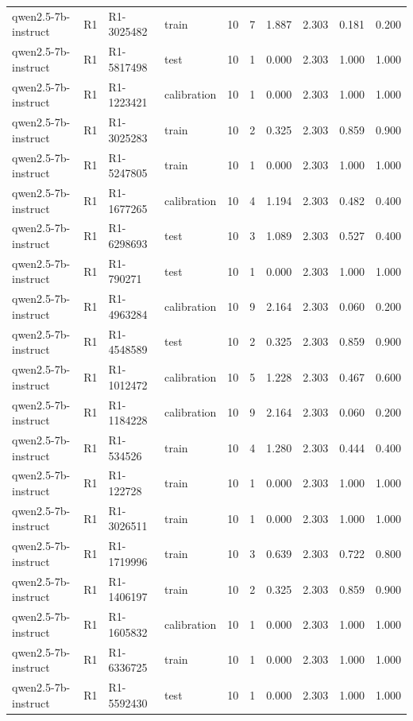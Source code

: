 \begin{table}
\begin{tabular}{llllrrrrrr}
qwen2.5-7b-instruct & R1 & R1-3025482 & train & 10 & 7 & 1.887 & 2.303 & 0.181 & 0.200 \\
qwen2.5-7b-instruct & R1 & R1-5817498 & test & 10 & 1 & 0.000 & 2.303 & 1.000 & 1.000 \\
qwen2.5-7b-instruct & R1 & R1-1223421 & calibration & 10 & 1 & 0.000 & 2.303 & 1.000 & 1.000 \\
qwen2.5-7b-instruct & R1 & R1-3025283 & train & 10 & 2 & 0.325 & 2.303 & 0.859 & 0.900 \\
qwen2.5-7b-instruct & R1 & R1-5247805 & train & 10 & 1 & 0.000 & 2.303 & 1.000 & 1.000 \\
qwen2.5-7b-instruct & R1 & R1-1677265 & calibration & 10 & 4 & 1.194 & 2.303 & 0.482 & 0.400 \\
qwen2.5-7b-instruct & R1 & R1-6298693 & test & 10 & 3 & 1.089 & 2.303 & 0.527 & 0.400 \\
qwen2.5-7b-instruct & R1 & R1-790271 & test & 10 & 1 & 0.000 & 2.303 & 1.000 & 1.000 \\
qwen2.5-7b-instruct & R1 & R1-4963284 & calibration & 10 & 9 & 2.164 & 2.303 & 0.060 & 0.200 \\
qwen2.5-7b-instruct & R1 & R1-4548589 & test & 10 & 2 & 0.325 & 2.303 & 0.859 & 0.900 \\
qwen2.5-7b-instruct & R1 & R1-1012472 & calibration & 10 & 5 & 1.228 & 2.303 & 0.467 & 0.600 \\
qwen2.5-7b-instruct & R1 & R1-1184228 & calibration & 10 & 9 & 2.164 & 2.303 & 0.060 & 0.200 \\
qwen2.5-7b-instruct & R1 & R1-534526 & train & 10 & 4 & 1.280 & 2.303 & 0.444 & 0.400 \\
qwen2.5-7b-instruct & R1 & R1-122728 & train & 10 & 1 & 0.000 & 2.303 & 1.000 & 1.000 \\
qwen2.5-7b-instruct & R1 & R1-3026511 & train & 10 & 1 & 0.000 & 2.303 & 1.000 & 1.000 \\
qwen2.5-7b-instruct & R1 & R1-1719996 & train & 10 & 3 & 0.639 & 2.303 & 0.722 & 0.800 \\
qwen2.5-7b-instruct & R1 & R1-1406197 & train & 10 & 2 & 0.325 & 2.303 & 0.859 & 0.900 \\
qwen2.5-7b-instruct & R1 & R1-1605832 & calibration & 10 & 1 & 0.000 & 2.303 & 1.000 & 1.000 \\
qwen2.5-7b-instruct & R1 & R1-6336725 & train & 10 & 1 & 0.000 & 2.303 & 1.000 & 1.000 \\
qwen2.5-7b-instruct & R1 & R1-5592430 & test & 10 & 1 & 0.000 & 2.303 & 1.000 & 1.000 \\

\end{tabular}
\end{table}
